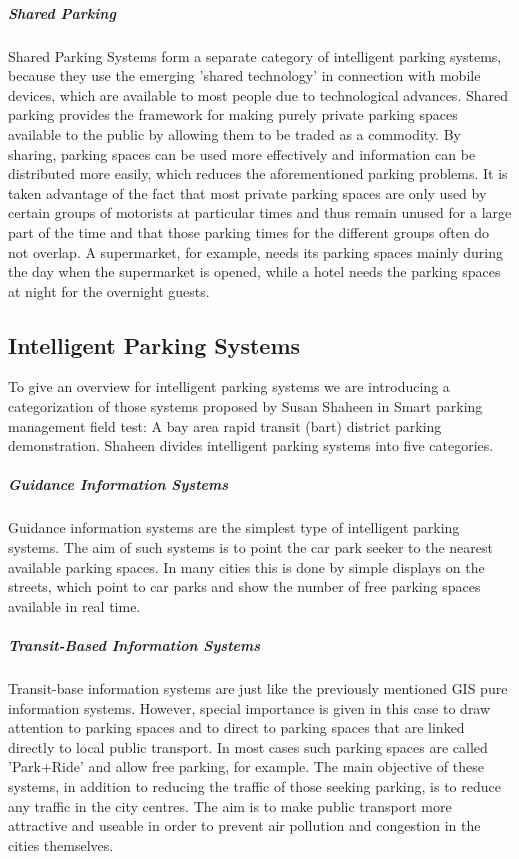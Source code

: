 \documentclass[
a4paper,     %
titlepage,   %
14pt         %
]{scrartcl}  %
\theoremstyle{mystyle}
\begin{document}
\subparagraph{Shared Parking}
Shared Parking Systems form a separate category of intelligent parking systems, because they use the emerging 'shared technology' in connection with mobile devices, which are available to most people due to technological advances. Shared parking provides the framework for making purely private parking spaces available to the public by allowing them to be traded as a commodity. \cite{itdp2014shared} By sharing, parking spaces can be used more effectively and information can be distributed more easily, which reduces the aforementioned parking problems. It is taken advantage of the fact that most private parking spaces are only used by certain groups of motorists at particular times and thus remain unused for a large part of the time and that those parking times for the different groups often do not overlap.\cite{vtpi2015shared} A supermarket, for example, needs its parking spaces mainly during the day when the supermarket is opened, while a hotel needs the parking spaces at night for the overnight guests.\\

\subsection{Intelligent Parking Systems}

To give an overview for intelligent parking systems we are introducing a categorization of those systems proposed by Susan Shaheen in Smart parking management field test: A bay area rapid transit (bart) district parking demonstration.\cite{shaheen2005smart} Shaheen divides intelligent parking systems into five categories.

\subparagraph{Guidance Information Systems}
Guidance information systems are the simplest type of intelligent parking systems. The aim of such systems is to point the car park seeker to the nearest available parking spaces. In many cities this is done by simple displays on the streets, which point to car parks and show the number of free parking spaces available in real time.

\subparagraph{Transit-Based Information Systems}
Transit-base information systems are just like the previously mentioned GIS pure information systems. However, special importance is given in this case to draw attention to parking spaces and to direct to parking spaces that are linked directly to local public transport. In most cases such parking spaces are called 'Park+Ride' and allow free parking, for example. The main objective of these systems, in addition to reducing the traffic of those seeking parking, is to reduce any traffic in the city centres. The aim is to make public transport more attractive and useable in order to prevent air pollution and congestion in the cities themselves. 
\end{document}
